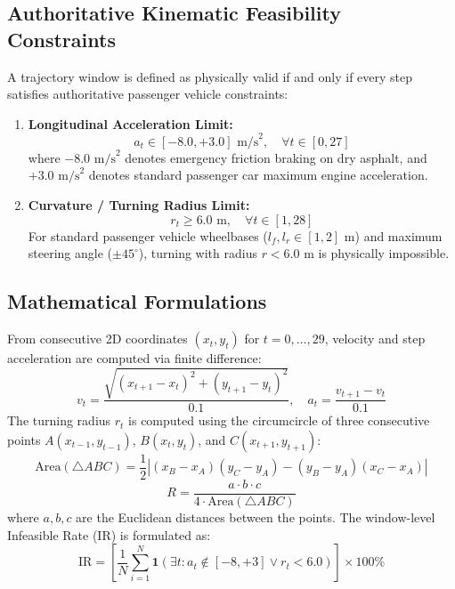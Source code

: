 \documentclass[11pt,a4paper]{article}
\begin{document}
\subsection{Authoritative Kinematic Feasibility Constraints}
A trajectory window is defined as physically valid if and only if every step satisfies authoritative passenger vehicle constraints:
\begin{enumerate}[leftmargin=1.5em, itemsep=2pt]
    \item \textbf{Longitudinal Acceleration Limit:}
    \begin{equation}
        a_t \in [-8.0, +3.0]\text{ m/s}^2, \quad \forall t \in [0, 27]
    \end{equation}
    where $-8.0\text{ m/s}^2$ denotes emergency friction braking on dry asphalt, and $+3.0\text{ m/s}^2$ denotes standard passenger car maximum engine acceleration.
    \item \textbf{Curvature / Turning Radius Limit:}
    \begin{equation}
        r_t \ge 6.0\text{ m}, \quad \forall t \in [1, 28]
    \end{equation}
    For standard passenger vehicle wheelbases ($l_f, l_r \in [1, 2]\text{ m}$) and maximum steering angle ($\pm 45^\circ$), turning with radius $r < 6.0\text{ m}$ is physically impossible.
\end{enumerate}

\subsection{Mathematical Formulations}
From consecutive 2D coordinates $(x_t, y_t)$ for $t = 0, \dots, 29$, velocity and step acceleration are computed via finite difference:
\begin{equation}
    v_t = \frac{\sqrt{(x_{t+1} - x_t)^2 + (y_{t+1} - y_t)^2}}{0.1}, \quad a_t = \frac{v_{t+1} - v_t}{0.1}
\end{equation}
The turning radius $r_t$ is computed using the circumcircle of three consecutive points $A(x_{t-1}, y_{t-1})$, $B(x_t, y_t)$, and $C(x_{t+1}, y_{t+1})$:
\begin{equation}
    \text{Area}(\triangle ABC) = \frac{1}{2} |(x_B - x_A)(y_C - y_A) - (y_B - y_A)(x_C - x_A)|
\end{equation}
\begin{equation}
    R = \frac{a \cdot b \cdot c}{4 \cdot \text{Area}(\triangle ABC)}
\end{equation}
where $a, b, c$ are the Euclidean distances between the points. The window-level Infeasible Rate (IR) is formulated as:
\begin{equation}
    \text{IR} = \left[ \frac{1}{N} \sum_{i=1}^{N} \mathbf{1}\left( \exists t : a_t \notin [-8, +3] \lor r_t < 6.0 \right) \right] \times 100\%
\end{equation}
\end{document}
